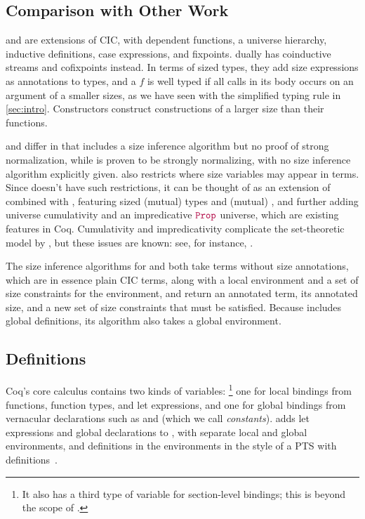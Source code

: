 \subsection{Comparison with Other Work}\label{sec:overview:comparison}

\CIChat and \CIChatminus are extensions of CIC, with dependent functions, a universe hierarchy, inductive definitions, case expressions, and fixpoints.
\CChatomega dually has coinductive streams and cofixpoints instead.
In terms of sized types, they add size expressions as annotations to \coinductive types,
and a \cofixpoint $f$ is well typed if all \corecursive calls in its body occurs on an argument of a smaller sizes,
as we have seen with the simplified typing rule in \autoref{sec:intro}.
Constructors construct constructions of a larger size than their \corecursive functions.

\CIChat and \CIChatminus differ in that \CIChat includes a size inference algorithm but no proof of strong normalization,
while \CIChatminus is proven to be strongly normalizing, with no size inference algorithm explicitly given.
\CIChatminus also restricts where size variables may appear in terms.
Since \lang doesn't have such restrictions, it can be thought of as an extension of \CIChat combined with \CChatomega,
featuring sized (mutual) \coinductive types and (mutual) \cofixpoints,
and further adding universe cumulativity and an impredicative $\Prop$ universe,
which are existing features in Coq.
Cumulativity and impredicativity complicate the set-theoretic model by \citet{cic-hat-minus}, but these issues are known: see, for instance, \citet{not-so-simple-cc}.

The size inference algorithms for \CIChat and \lang both take terms without size annotations,
which are in essence plain CIC terms, along with a local environment
and a set of size constraints for the environment,
and return an annotated term, its annotated size, and a new set of size constraints that must be satisfied.
Because \lang includes global definitions, its algorithm also takes a global environment.

\subsection{Definitions}

Coq's core calculus contains two kinds of variables:%
\footnote{It also has a third type of variable for section-level bindings;
this is beyond the scope of \lang.}
one for local bindings from functions, function types, and let expressions,
and one for global bindings from vernacular declarations such as  and  (which we call \textit{constants}).
\lang adds let expressions and global declarations to \CIChat,
with separate local and global environments,
and definitions in the environments in the style of a PTS with definitions~\citep{pts}.

